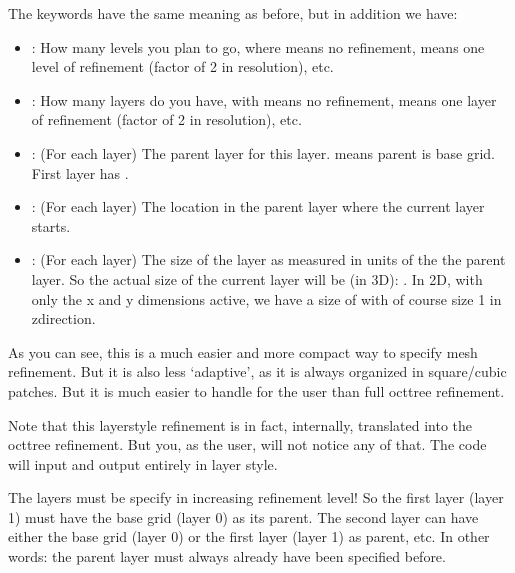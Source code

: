 \documentclass[letterpaper,10pt,english]{sphinxmanual}
\begin{document}
The keywords have the same meaning as before, but in addition we have:
\begin{itemize}
\item {} 
: How many levels you plan to go, where
 means no refinement,  means one level of refinement
(factor of 2 in resolution), etc.

\item {} 
: How many layers do you have, with 
means no refinement,  means one layer of refinement (factor of
2 in resolution), etc.

\item {} 
: (For each layer) The parent layer for this
layer.  means parent is base grid. First layer has .

\item {} 
: (For each layer) The location in the parent
layer where the current layer starts.

\item {} 
: (For each layer) The size of the layer as measured in units of
the the parent layer. So the actual size of the current layer will be (in
3\sphinxhyphen{}D): . In 2\sphinxhyphen{}D, with only the x\sphinxhyphen{} and y\sphinxhyphen{} dimensions active,
we have a size of  with of course size 1 in z\sphinxhyphen{}direction.

\end{itemize}

As you can see, this is a much easier and more compact way to specify
mesh refinement. But it is also less ‘adaptive’, as it is always organized
in square/cubic patches. But it is much easier to handle for the user than
full oct\sphinxhyphen{}tree refinement.

Note that this layer\sphinxhyphen{}style refinement is in fact, internally, translated
into the oct\sphinxhyphen{}tree refinement. But you, as the user, will not notice any
of that. The code will input and output entirely in layer style.

 The layers must be specify in increasing refinement level!  So
the first layer (layer 1) must have the base grid (layer 0) as its
parent. The second layer can have either the base grid (layer 0) or the
first layer (layer 1) as parent, etc. In other words: the parent layer
must always already have been specified before.
\end{document}
